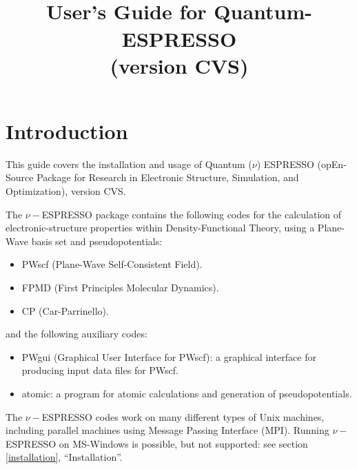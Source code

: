 \documentclass[12pt,a4paper]{article}
\def\version{CVS}
\begin{document}
 

\author{}
\date{}
\title{
  \hfill%
  \vspace{1.5cm}
  \\
  \huge User's Guide for Quantum-ESPRESSO \smallskip\\
  \Large (version \version)
}
\maketitle

\tableofcontents

\clearpage

\section{Introduction}

This guide covers the installation and usage of Quantum ($\nu$)
ESPRESSO (opEn-Source Package for Research in Electronic Structure, 
Simulation, and Optimization), version \version.

The $\nu-$ESPRESSO package contains the following codes for the
calculation of electronic-structure properties within
Density-Functional Theory, using a Plane-Wave basis set and
pseudopotentials:
\begin{itemize}
  \item PWscf (Plane-Wave Self-Consistent Field).
  \item FPMD (First Principles Molecular Dynamics).
  \item CP (Car-Parrinello).
\end{itemize}
and the following auxiliary codes:
\begin{itemize}
  \item PWgui (Graphical User Interface for PWscf): a graphical
        interface for producing input data files for PWscf.
  \item atomic: a program for atomic calculations and generation of
        pseudopotentials.
\end{itemize}
The $\nu-$ESPRESSO codes work on many different types of Unix machines,
including parallel machines using Message Passing Interface (MPI).
Running $\nu-$ESPRESSO on MS-Windows is possible, but not supported: 
see section \ref{installation}, ``Installation''.
\end{document}
